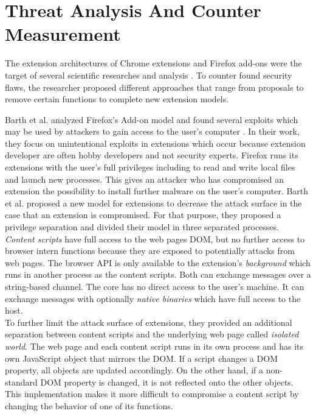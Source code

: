 
\section{Threat Analysis And Counter Measurement}
	
	The extension architectures of Chrome extensions and Firefox add-ons were the target of several scientific researches and analysis \cite{Barth10protectingbrowsers,Carlini:2012:EGC:2362793.2362800,Hallaraker:2005:DMJ:1078029.1078861,Liu12chromeextensions:,TerLouw:2007:EWB:1420581.1420583,cs2015sentinel}. To counter found security flaws, the researcher proposed different approaches that range from proposals to remove certain functions to complete new extension models. 
	
	Barth et al. analyzed Firefox's Add-on model and found several exploits which may be used by attackers to gain access to the user's computer \cite{Barth10protectingbrowsers}. In their work, they focus on unintentional exploits in extensions which occur because extension developer are often hobby developers and not security experts. Firefox runs its extensions with the user's full privileges including to read and write local files and launch new processes. This gives an attacker who has compromised an extension the possibility to install further malware on the user's computer. Barth et al. proposed a new model for extensions to decrease the attack surface in the case that an extension is compromised. For that purpose, they  proposed a privilege separation and divided their model in three separated processes. \textit{Content scripts} have full access to the web pages DOM, but no further access to browser intern functions because they are exposed to potentially attacks from web pages. The browser API is only available to the extension's \textit{background} which runs in another process as the content scripts. Both can exchange messages over a string-based channel. The core has no direct access to the user's machine. It can exchange messages with optionally \textit{native binaries} which have full access to the host. \\
	To further limit the attack surface of extensions, they provided an additional separation between content scripts and the underlying web page called \textit{isolated world}. The web page and each content script runs in its own process and has its own JavaScript object that mirrors the DOM. If a script changes a DOM property, all objects are updated accordingly. On the other hand, if a non-standard DOM property is changed, it is not reflected onto the other objects. This implementation makes it more difficult to compromise a content script by changing the behavior of one of its functions. \\

